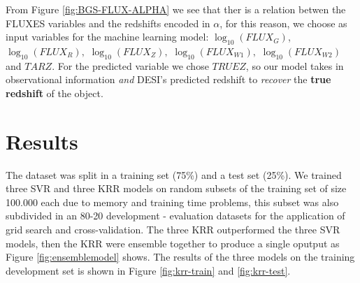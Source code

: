 \documentclass[]{article}
\begin{document}
From Figure \ref{fig:BGS-FLUX-ALPHA} we see that ther is a relation betwen the FLUXES variables and the redshifts encoded in $\alpha$, for this reason, we choose as input variables for the machine learning model: $\log_{10}(FLUX_G)$, $\log_{10}(FLUX_R),$ $\log_{10}(FLUX_Z),$  $\log_{10}(FLUX_{W1}),$  $\log_{10}(FLUX_{W2})$ and $TARZ$. For the predicted variable we chose $TRUEZ$, so our model takes in observational information \textit{and} DESI's predicted redshift to \textit{recover} the \textbf{true redshift} of the object. 

\section{Results}
The dataset was split in a training set (75\%) and a test set (25\%). We trained three SVR and three KRR models on random subsets of the training set of size 100.000 each due to memory and training time problems, this subset was also subdivided in an 80-20 development - evaluation datasets for the application of grid search and cross-validation. The three KRR outperformed the three SVR models, then the KRR were ensemble together to produce a single oputput as Figure \ref{fig:ensemblemodel} shows. The results of the three models on the training  development set is shown in Figure \ref{fig:krr-train} and \ref{fig:krr-test}.
  
\end{document}
